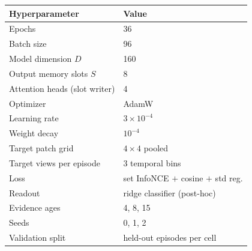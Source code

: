 \begin{tabular}{ll}
\toprule
Hyperparameter & Value\\
\midrule
Epochs & 36\\
Batch size & 96\\
Model dimension $D$ & 160\\
Output memory slots $S$ & 8\\
Attention heads (slot writer) & 4\\
Optimizer & AdamW\\
Learning rate & $3\times10^{-4}$\\
Weight decay & $10^{-4}$\\
Target patch grid & $4\times4$ pooled\\
Target views per episode & 3 temporal bins\\
Loss & set InfoNCE $+$ cosine $+$ std reg.\\
Readout & ridge classifier (post-hoc)\\
Evidence ages & 4, 8, 15\\
Seeds & 0, 1, 2\\
Validation split & held-out episodes per cell\\
\bottomrule
\end{tabular}
